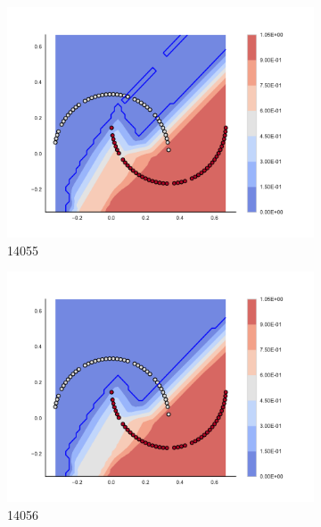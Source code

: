\begin{figure}[h]
\begin{subfigure}[b]{0.09\textwidth}
    \includegraphics[clip, trim=2.35cm 1.75cm 4.5cm 0cm,width=\textwidth]{img/convergence/14055.pdf}
    \caption{14055}
    \label{fig:convergence_14055}
\end{subfigure}
%
\begin{subfigure}[b]{0.09\textwidth}
    \includegraphics[clip, trim=2.35cm 1.75cm 4.5cm 0cm,width=\textwidth]{img/convergence/14056.pdf}
    \caption{14056}
    \label{fig:convergence_14056}
\end{subfigure}
%
\begin{subfigure}[b]{0.09\textwidth}

\end{subfigure}
\end{figure}
